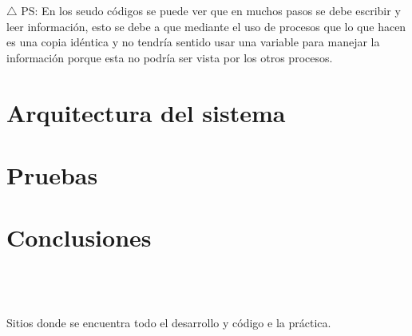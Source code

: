 \documentclass[
	final,
	notitlepage,
	narroweqnarray,
	inline,
	twoside,
	]{ieee}
\begin{document}
	$\triangle$ PS: En los seudo códigos se puede ver que en muchos pasos se debe escribir y leer información, esto se debe a que mediante el uso
	de procesos que lo que hacen es una copia idéntica y no tendría sentido usar una variable para manejar la información porque esta no podría ser
	vista por los otros procesos.

\section{Arquitectura del sistema}
	

\section{Pruebas}
	
	
\section{Conclusiones}
	
	
\begin{thebibliography}{1}

\\
 \\
 \\
\newblock Sitios donde se encuentra todo el desarrollo y código e la práctica.

\\
\\
\\

\end{thebibliography}
\end{document}
